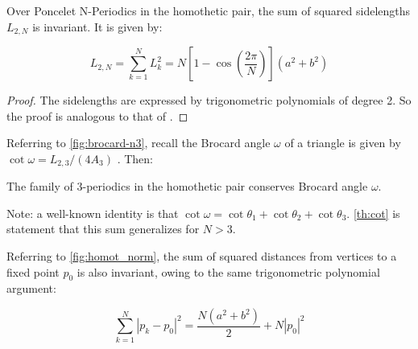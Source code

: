 \begin{proposition}
\label{prop:sqr_si}
Over Poncelet N-Periodics in the homothetic pair, the sum of squared sidelengths $L_{2,N}$ is invariant. It is given by:

\[ L_{2,N}= \sum_{k=1}^N L_k^2=N \left[ 1-\cos \left(  {\frac {2\pi}{N}} \right)  \right]  \left(
{a}^{2}+{b}^{2} \right) 
	\]
\end{proposition}

\begin{proof}
The sidelengths are expressed by trigonometric polynomials of degree 2. So the proof is analogous to that of   .
\end{proof}
\noindent Referring to \cref{fig:brocard-n3}, recall the Brocard angle $\omega$ of a triangle is given by $\cot\omega=L_{2,3}/(4A_3)$ \cite[Brocard Angle]{mw}. Then:

\begin{corollary}
The family of 3-periodics in the homothetic pair conserves Brocard angle $\omega$.    
\end{corollary}

Note: a well-known identity is that $\cot\omega=\cot\theta_1+\cot\theta_2+\cot\theta_3$. \cref{th:cot} is statement that this sum generalizes for $N>3$. 


Referring to \cref{fig:homot_norm}, the sum of squared distances from vertices to a fixed point $p_0$ is also invariant, owing to the same trigonometric polynomial argument:

\begin{corollary}
\[   \sum_{k=1}^N |p_k-p_0|^2=\frac{ N(a^2 + b^2)}{2} + N |p_0|^2
\]
\label{cor:p0}
\end{corollary}




